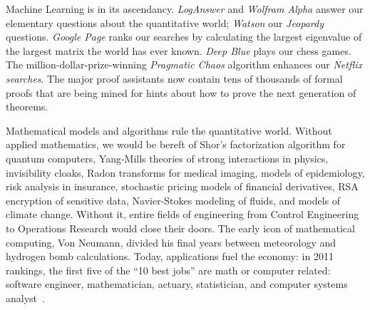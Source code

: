 \documentclass{llncs}
\begin{document}
Machine Learning is in its ascendancy.  {\it LogAnswer} and {\it
  Wolfram Alpha} answer our elementary questions about the
quantitative world; {\it Watson} our {\it Jeopardy} questions. {\it
  Google Page} ranks our searches by calculating the largest eigenvalue of the largest matrix
the world has ever known.  {\it Deep Blue} plays our chess
games. The million-dollar-prize-winning {\it Pragmatic Chaos}
algorithm enhances our {\it Netflix searches}.  The major proof
assistants now contain tens of thousands of formal proofs that are
being mined for hints about how to prove the next generation of
theorems.

Mathematical models and algorithms rule the quantitative world.
Without applied mathematics, we would be bereft of Shor's
factorization algorithm for quantum computers, Yang-Mills theories of
strong interactions in physics, invisibility cloaks, Radon transforms
for medical imaging, models of epidemiology, risk analysis in
insurance, stochastic pricing models of financial derivatives, RSA
encryption of sensitive data, Navier-Stokes modeling of fluids, and
models of climate change.
Without it, entire fields of engineering from Control Engineering to
Operations Research would close their doors.  The early icon of
mathematical computing, Von Neumann, divided his final years between
meteorology and hydrogen bomb calculations.
Today, applications fuel the
economy: in 2011 rankings, the first five of the ``10 best jobs'' are
math or computer related: software engineer, mathematician, actuary,
statistician, and computer systems analyst~\cite{CC11}.  



\end{document}
